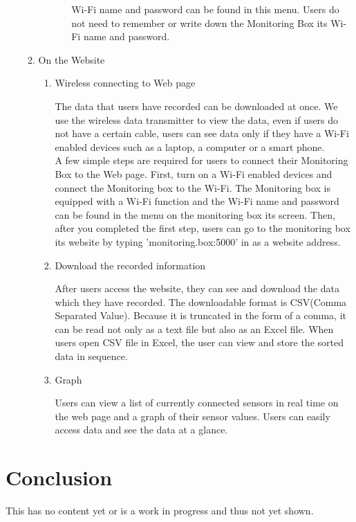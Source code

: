\documentclass[conference]{IEEEtran}
\begin{document}
\begin{enumerate}
\begin{enumerate}
\begin{enumerate}
\begin{enumerate}
						Wi-Fi name and password can be found in this menu. Users do not need to remember or write down the Monitoring Box its Wi-Fi name and password.\\
				\end{enumerate}
			\end{enumerate}
		\item On the Website
			\begin{enumerate}
				\item Wireless connecting to Web page

					The data that users have recorded can be downloaded at once. We use the wireless data transmitter to view the data, even if users do not have a certain cable, users can see data only if they have a Wi-Fi enabled devices such as a laptop, a computer or a smart phone. \\
					A few simple steps are required for users to connect their Monitoring Box to the Web page. First, turn on a Wi-Fi enabled devices and connect the Monitoring box to the Wi-Fi. The Monitoring box is equipped with a Wi-Fi function and the Wi-Fi name and password can be found in the menu on the monitoring box its screen. Then, after you completed the first step, users can go to the monitoring box its website by typing 'monitoring.box:5000' in as a website address.\\

				\item Download the recorded information

					After users access the website, they can see and download the data which they have recorded. The downloadable format is CSV(Comma Separated Value). Because it is truncated in the form of a comma, it can be read not only as a text file but also as an Excel file. When users open CSV file in Excel, the user can view and store the sorted data in sequence.\\

				\item Graph

					Users can view a list of currently connected sensors in real time on the web page and a graph of their sensor values. Users can easily access data and see the data at a glance.\\
			\end{enumerate}
		\end{enumerate}
 	\end{enumerate}
\section{Conclusion}
	This has no content yet or is a work in progress and thus not yet shown.
\end{document}
